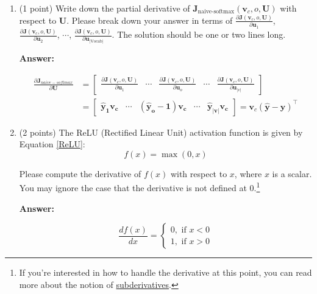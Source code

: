 \documentclass{article}
\newenvironment{answer}{
    {\bf Answer:} \sf \begingroup\color{red}
}{\endgroup}%
\begin{document}
\begin{enumerate}[label=(\alph*)]
\item (1 point) Write down the partial derivative of $\bm J_{\text{naive-softmax}}(\bm v_c, o, \bm U)$ with respect to $\bm U$. Please break down your answer in terms of $\frac{\partial \bm J(\bm v_c, o, \bm U)}{\partial \bm u_1}$, $\frac{\partial \bm J(\bm v_c, o, \bm U)}{\partial \bm u_2}$, $\cdots$, $\frac{\partial \bm J(\bm v_c, o, \bm U)}{\partial \bm u_{|\text{Vocab}|}}$. The solution should be one or two lines long.

\begin{shaded}
\begin{answer}
\begin{align*}
\frac{\partial \bm J_{naive-softmax}}{\partial \bm U}
&= \begin{bmatrix} \frac{\partial \bm J(\bm v_c, o, \bm U)}{\partial \bm u_1} & \cdots & \frac{\partial \bm J(\bm v_c, o, \bm U)}{\partial \bm u_o} & \cdots & \frac{\partial \bm J(\bm v_c, o, \bm U)}{\partial \bm u_{|v|}} \end{bmatrix}\\
&= \begin{bmatrix} \bm{\hat{y}_1}\bm{v_c} & \cdots & (\bm{\hat{y}_o - 1})\bm{v_c} & \cdots & \bm{\hat{y}_{|v|}}\bm{v_c} \end{bmatrix} = \bm v_c (\bm{\hat{y}} - \bm y)^\top
\end{align*}
\end{answer}
\end{shaded}

\item (2 points) The ReLU (Rectified Linear Unit) activation function is given by Equation \ref{ReLU}:
\begin{equation}
    \label{ReLU}
    f(x) = \max(0, x)
\end{equation}

Please compute the derivative of $f(x)$ with respect to $x$, where $x$ is a scalar. You may ignore the case that the derivative is not defined at 0.\footnote{If you're interested in how to handle the derivative at this point, you can read more about the notion of \hyperref[https://en.wikipedia.org/wiki/Subderivative]{subderivatives}.}

\begin{shaded}
\begin{answer}
$$
\frac{df(x)}{dx} = \begin{cases} 
0, \text{ if } x < 0 \\
1, \text{ if } x > 0
\end{cases}
$$
\end{answer}
\end{shaded}


\end{enumerate}
\end{document}
